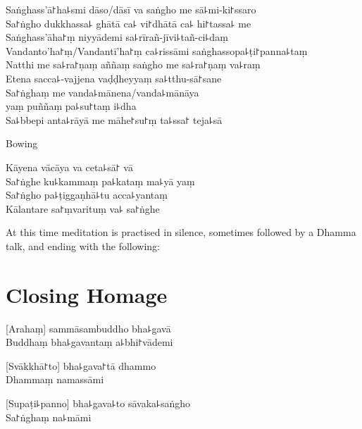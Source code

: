 \enlargethispage{\baselineskip}
\clearpage

Saṅghass'ā꜓ha꜕smi dāso/dāsī va saṅgho me sā꜕mi-ki꜓ssaro\\%
Sa꜓ṅgho dukkhassa꜕ ghātā ca꜕ vi꜓dhātā ca꜕ hi꜓tassa꜕ me\\
Saṅghass'āha꜓ṃ niyyādemi sa꜕rīrañ-jīvi꜕tañ-ci꜕daṃ\\
Vandanto'ha꜓ṃ/Vandantī'ha꜓ṃ ca꜕rissāmi saṅghassopa꜕ṭi꜓panna꜕taṃ\\
Natthi me sa꜕ra꜓ṇaṃ aññaṃ saṅgho me sa꜕ra꜓ṇaṃ va꜕raṃ\\
Etena sacca꜕-vajjena vaḍḍheyyaṃ sa꜕tthu-sā꜓sane\\
Sa꜓ṅghaṃ me vanda꜕mānena/vanda꜕mānāya\\
\vin yaṃ puññaṃ pa꜕su꜓taṃ i꜕dha\\
Sa꜕bbepi anta꜕rāyā me māhe꜓su꜓ṃ ta꜕ssa꜓ teja꜕sā

\begin{instruction}
  Bowing
\end{instruction}

Kāyena vācāya va ceta꜕sā꜓ vā\\
Sa꜓ṅghe ku꜕kammaṃ pa꜕kataṃ ma꜕yā yaṃ\\
Sa꜓ṅgho pa꜕ṭiggaṇhā꜕tu acca꜕yantaṃ\\
Kālantare sa꜓ṃvarituṃ va꜕ sa꜓ṅghe

\vfill

\begin{instruction}
  At this time meditation is practised in silence, sometimes followed by a Dhamma talk, and ending with the following:
\end{instruction}

\chapter*{Closing Homage}%

\delegateSetUseNext

[Arahaṃ] sammāsambuddho bha꜕gavā\\
Buddhaṃ bha꜕gavantaṃ a꜕bhi꜓vādemi 

[Svākkhā꜓to] bha꜕gava꜓tā dhammo\\
Dhammaṃ namassāmi 

[Supaṭi꜕panno] bha꜕gava꜕to sāvaka꜕saṅgho\\
Sa꜓ṅghaṃ na꜕māmi 

\clearpage

